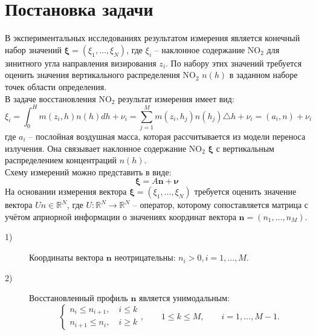 \documentclass[a4paper,12pt]{article}
\theoremstyle{plain}
\theoremstyle{definition}
\theoremstyle{remark}
\newcommand{\nl}{\\ \indent}
\begin{document}
\section{Постановка задачи}
В экспериментальных исследованиях результатом 
измерения является конечный набор значений
$\pmb{\xi} = (\xi_1, \ldots, \xi_N)$,
где $\xi_i$ -- наклонное содержание
$\text{NO}_2$ для зинитного угла направления
визирования $z_i$.
По набору этих значений требуется оценить значения вертикального
распределения $\text{NO}_2$ $n(h)$ в заданном наборе точек
области определения.
\nl
В задаче восстановления $\text{NO}_2$ результат измерения
имеет вид:
\begin{equation}
\xi_i = 
\int_{0}^{H}m(z_i, h)n(h)dh + \nu_i =
\sum\limits_{j=1}^{M}m(z_i, h_j) n(h_j) \triangle h
+ \nu_i = (a_i, n) + \nu_i
\end{equation}
где $a_i$ -- послойная воздушная масса,
которая рассчитывается из модели переноса излучения.
Она связывает наклонное содержание
$\text{NO}_2$ $\pmb{\xi}$
с вертикальным распределением концентраций $n(h)$.
\nl
Схему измерений можно представить в виде:
\begin{equation}
\pmb\xi = A \pmb{n} + \pmb{\nu}
\end{equation}
На основании измерения вектора
$\pmb\xi = (\xi_1, \ldots, \xi_N)$
требуется оценить значение вектора
$Un \in \mathbb{R}^N$, 
где $U: \mathbb{R}^N \rightarrow \mathbb{R}^N$ --
оператор, которому сопоставляется матрица с учётом 
априорной информации о значениях координат вектора 
$\pmb{n} = (n_1, \ldots, n_M)$.
\begin{description}
\item[1)]
Координаты вектора $\pmb n$ неотрицательны:
$n_i > 0, i=1, \ldots, M.$
\item[2)]
Восстановленный профиль $\pmb n$ является унимодальным:
\begin{equation}
\begin{cases}
n_i \leq n_{i+1}, \quad i \leq k \\
n_{i+1} \leq n_i, \quad i \geq k
\end{cases}, \qquad
1 \leq k \leq M, \qquad
i = 1, \ldots, M-1.
\end{equation}
\end{description}
\end{document}
